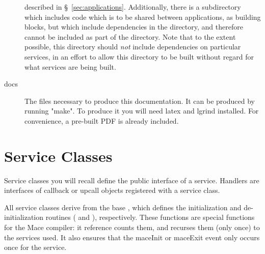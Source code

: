 \begin{description}
            described in \S~\ref{sec:applications}.  Additionally, there is a  subdirectory
            which includes code which is to be shared between applications, as building blocks, but which include
            dependencies in the  directory, and therefore cannot be included
            as part of the  directory.  Note that to the extent possible, this directory should
            \emph{not} include dependencies on particular services, in an effort to allow this directory to be built 
            without regard for what services are being built.
\item [docs] The files necessary to produce this documentation.  It can be produced by running "make".  To 
            produce it you will need latex and lgrind installed.  For convenience, a pre-built PDF is already
            included.
\end{description}

\section{Service Classes}
\label{sec:service-classes}


Service classes you will recall define the public interface of a service.
Handlers are interfaces of callback or upcall objects registered with 
a service class.

All service classes derive from the base , which 
defines the initialization and de-initialization routines (
and ), respectively.  These functions are special functions
for the Mace compiler: it reference counts them, and recurses them (only once)
to the services used.  It also ensures that the maceInit or maceExit event
only occurs once for the service.

